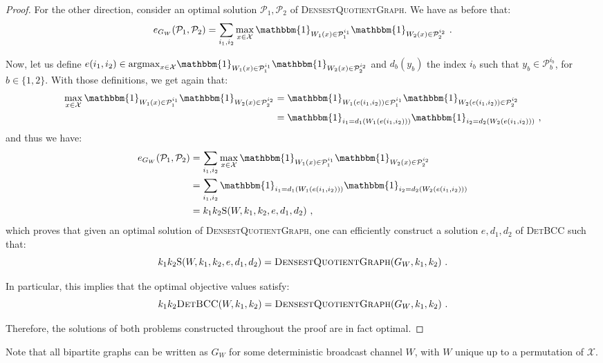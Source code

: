 \begin{proof}
For the other direction, consider an optimal solution $\mathcal{P}_1,\mathcal{P}_2$ of \textsc{DensestQuotientGraph}. We have as before that:
\[ e_{G_W}(\mathcal{P}_1,\mathcal{P}_2) =  \sum_{i_1,i_2} \max_{x \in \mathcal{X}}\mathbbm{1}_{W_1(x) \in \mathcal{P}_1^{i_1}}\mathbbm{1}_{W_2(x) \in \mathcal{P}_2^{i_2}} \ . \]

Now, let us define $e(i_1,i_2) \in \text{argmax}_{x \in \mathcal{X}}\mathbbm{1}_{W_1(x) \in \mathcal{P}_1^{i_1}}\mathbbm{1}_{W_2(x) \in \mathcal{P}_2^{i_2}}$ and $d_b(y_b)$ the index $i_b$ such that $y_b \in \mathcal{P}_b^{i_b}$, for $b \in \{1,2\}$. With those definitions, we get again that:
\begin{equation}
  \begin{aligned}
    \max_{x \in \mathcal{X}}\mathbbm{1}_{W_1(x) \in \mathcal{P}_1^{i_1}}\mathbbm{1}_{W_2(x) \in \mathcal{P}_2^{i_2}} &= \mathbbm{1}_{W_1(e(i_1,i_2)) \in \mathcal{P}_1^{i_1}}\mathbbm{1}_{W_2(e(i_1,i_2)) \in \mathcal{P}_2^{i_2}}\\
    &= \mathbbm{1}_{i_1=d_1(W_1(e(i_1,i_2)))}\mathbbm{1}_{i_2=d_2(W_2(e(i_1,i_2)))} \ ,
    \end{aligned}
\end{equation}
and thus we have:
\begin{equation}
  \begin{aligned}
e_{G_W}(\mathcal{P}_1,\mathcal{P}_2) &=  \sum_{i_1,i_2} \max_{x \in \mathcal{X}}\mathbbm{1}_{W_1(x) \in \mathcal{P}_1^{i_1}}\mathbbm{1}_{W_2(x) \in \mathcal{P}_2^{i_2}}\\
&= \sum_{i_1,i_2} \mathbbm{1}_{i_1=d_1(W_1(e(i_1,i_2)))}\mathbbm{1}_{i_2=d_2(W_2(e(i_1,i_2)))}\\
&= k_1k_2\mathrm{S}(W,k_1,k_2,e,d_1,d_2) \ ,
    \end{aligned}
\end{equation}
which proves that given an optimal solution of \textsc{DensestQuotientGraph}, one can efficiently construct a solution $e,d_1,d_2$ of \textsc{DetBCC} such that:
\[ k_1k_2\mathrm{S}(W,k_1,k_2,e,d_1,d_2) = \textsc{DensestQuotientGraph}(G_W,k_1,k_2) \ . \]

In particular, this implies that the optimal objective values satisfy:
\[ k_1k_2\textsc{DetBCC}(W,k_1,k_2) = \textsc{DensestQuotientGraph}(G_W,k_1,k_2) \ .\]

Therefore, the solutions of both problems constructed throughout the proof are in fact optimal.
\end{proof}

\begin{rk}
  Note that all bipartite graphs can be written as $G_W$ for some deterministic broadcast channel $W$, with $W$ unique up to a permutation of $\mathcal{X}$.
\end{rk}

